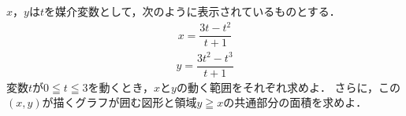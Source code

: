 \documentclass[../../main.tex]{subfiles}
\begin{document}
$x$，$y$は$t$を媒介変数として，次のように表示されているものとする．
\begin{align*}
  x=\dfrac{3t-t^2}{t+1}
\end{align*}
\begin{align*}
  y=\dfrac{3t^2-t^3}{t+1}
\end{align*}
変数$t$が$0 \leqq t \leqq 3$を動くとき，$x$と$y$の動く範囲をそれぞれ求めよ．
さらに，この$(x,y)$が描くグラフが囲む図形と領域$y \geqq x$の共通部分の面積を求めよ．
\end{document}
